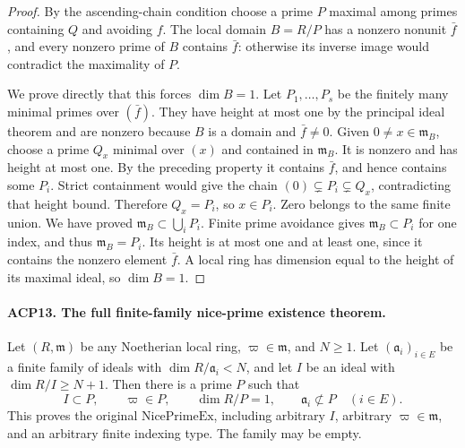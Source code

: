 \documentclass[11pt,a4paper]{article}
\numberwithin{equation}{section}
\theoremstyle{remark}\newtheorem{remark}[theorem]{Remark}
\begin{document}
\begin{proof}
By the ascending-chain condition choose a prime \(P\) maximal
among primes containing \(Q\) and avoiding \(f\).
The local domain \(B=R/P\) has a nonzero nonunit
\(\bar f\), and every nonzero prime of \(B\) contains
\(\bar f\): otherwise its inverse image would contradict
the maximality of \(P\).

We prove directly that this forces \(\dim B=1\).
Let \(P_1,\ldots,P_s\) be the finitely many minimal primes
over \((\bar f)\).  They have height at most one by the
principal ideal theorem and are nonzero because \(B\) is a
domain and \(\bar f\ne0\).
Given \(0\ne x\in\mathfrak m_B\), choose a prime \(Q_x\)
minimal over \((x)\) and contained in \(\mathfrak m_B\).
It is nonzero and has height at most one.  By the preceding
property it contains \(\bar f\), and hence contains some
\(P_i\).  Strict containment would give the chain
\((0)\subsetneq P_i\subsetneq Q_x\), contradicting that
height bound.  Therefore \(Q_x=P_i\), so \(x\in P_i\).
Zero belongs to the same finite union.  We have proved
\(\mathfrak m_B\subset\bigcup_iP_i\).
Finite prime avoidance gives \(\mathfrak m_B\subset P_i\)
for one index, and thus \(\mathfrak m_B=P_i\).
Its height is at most one and at least one, since it contains
the nonzero element \(\bar f\).  A local ring has dimension
equal to the height of its maximal ideal, so \(\dim B=1\).
\end{proof}

\paragraph{ACP13. The full finite-family nice-prime existence theorem.}
\label{claim:ACP13}
Let \((R,\mathfrak m)\) be any Noetherian local ring,
\(\varpi\in\mathfrak m\), and \(N\ge1\).
Let \((\mathfrak a_i)_{i\in E}\) be a finite family of ideals
with \(\dim R/\mathfrak a_i<N\), and let \(I\) be an ideal
with \(\dim R/I\ge N+1\).  Then there is a prime \(P\)
such that
\[
 I\subset P,\qquad \varpi\in P,\qquad \dim R/P=1,
 \qquad \mathfrak a_i\not\subset P\quad(i\in E).
                                                        \tag{ACP.24}
\]
This proves the original \(\mathrm{NicePrimeEx}\), including
arbitrary \(I\), arbitrary \(\varpi\in\mathfrak m\), and an
arbitrary finite indexing type.  The family may be empty.
\end{document}
